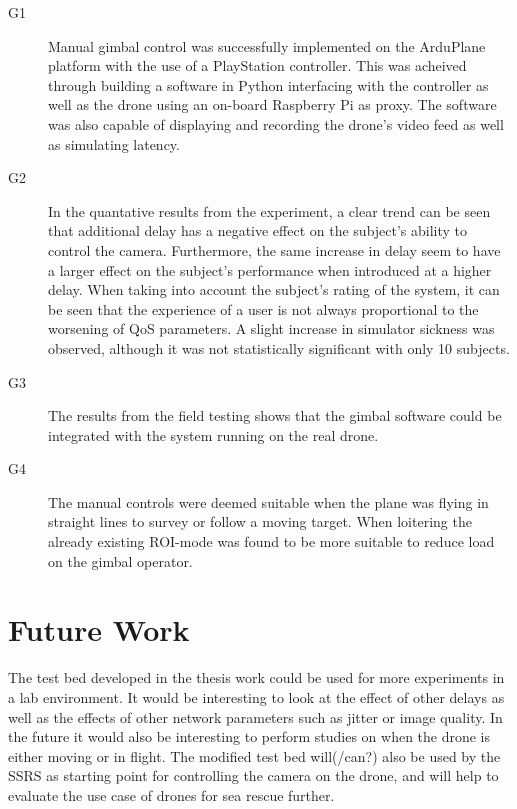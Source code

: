 \documentclass[nofilelist]{cslthse-msc}
\begin{document}
\begin{description}
   \item[G1]
   Manual gimbal control was successfully implemented on the ArduPlane platform with the use of a PlayStation controller. This was acheived through building a software in Python interfacing with the controller as well as the drone using an on-board Raspberry Pi as proxy. The software was also capable of displaying and recording the drone's video feed as well as simulating latency.

   \item[G2]
   In the quantative results from the experiment, a clear trend can be seen that additional delay has a negative effect on the subject's ability to control the camera. Furthermore, the same increase in delay seem to have a larger effect on the subject's performance when introduced at a higher delay. When taking into account the subject's rating of the system, it can be seen that the experience of a user is not always proportional to the worsening of QoS parameters. A slight increase in simulator sickness was observed, although it was not statistically significant with only 10 subjects.

   \item[G3] 
   The results from the field testing shows that the gimbal software could be integrated with the system running on the real drone.

   \item[G4]
   The manual controls were deemed suitable when the plane was flying in straight lines to survey or follow a moving target. When loitering the already existing ROI-mode was found to be more suitable to reduce load on the gimbal operator.

\end{description}

\chapter{Future Work}
The test bed developed in the thesis work could be used for more experiments in a lab environment. It would be interesting to look at the effect of other delays as well as the effects of other network parameters such as jitter or image quality. In the future it would also be interesting to perform studies on when the drone is either moving or in flight.
The modified test bed will(/can?) also be used by the SSRS as starting point for controlling the camera on the drone, and will help to evaluate the use case of drones for sea rescue further.

{}
\end{document}
